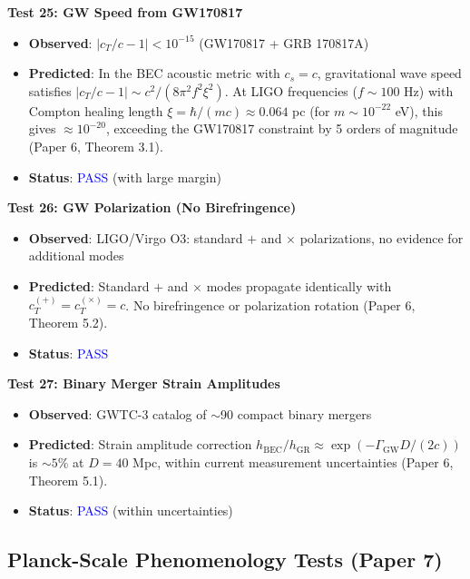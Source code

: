 \documentclass[11pt,a4paper]{article}
\theoremstyle{definition}
\theoremstyle{remark}
\begin{document}
\textbf{Test 25: GW Speed from GW170817}

\begin{itemize}[leftmargin=*, itemsep=0.1em]
\item \textbf{Observed}: $|c_T/c - 1| < 10^{-15}$ (GW170817 + GRB 170817A) \cite{Abbott2017}
\item \textbf{Predicted}: In the BEC acoustic metric with $c_s = c$, gravitational wave speed satisfies $|c_T/c - 1| \sim c^2/(8\pi^2 f^2 \xi^2)$. At LIGO frequencies ($f \sim 100$ Hz) with Compton healing length $\xi = \hbar/(mc) \approx 0.064$ pc (for $m \sim 10^{-22}$ eV), this gives $\approx 10^{-20}$, exceeding the GW170817 constraint by 5 orders of magnitude (Paper 6, Theorem 3.1).
\item \textbf{Status}: \textcolor{blue}{PASS} (with large margin)
\end{itemize}

\textbf{Test 26: GW Polarization (No Birefringence)}

\begin{itemize}[leftmargin=*, itemsep=0.1em]
\item \textbf{Observed}: LIGO/Virgo O3: standard $+$ and $\times$ polarizations, no evidence for additional modes
\item \textbf{Predicted}: Standard $+$ and $\times$ modes propagate identically with $c_T^{(+)} = c_T^{(\times)} = c$. No birefringence or polarization rotation (Paper 6, Theorem 5.2).
\item \textbf{Status}: \textcolor{blue}{PASS}
\end{itemize}

\textbf{Test 27: Binary Merger Strain Amplitudes}

\begin{itemize}[leftmargin=*, itemsep=0.1em]
\item \textbf{Observed}: GWTC-3 catalog of $\sim$90 compact binary mergers
\item \textbf{Predicted}: Strain amplitude correction $h_{\mathrm{BEC}}/h_{\mathrm{GR}} \approx \exp(-\Gamma_{\mathrm{GW}}D/(2c))$ is $\sim 5\%$ at $D = 40$ Mpc, within current measurement uncertainties (Paper 6, Theorem 5.1).
\item \textbf{Status}: \textcolor{blue}{PASS} (within uncertainties)
\end{itemize}

\subsection{Planck-Scale Phenomenology Tests (Paper 7)}
\label{sec:tests_planck}
\end{document}
